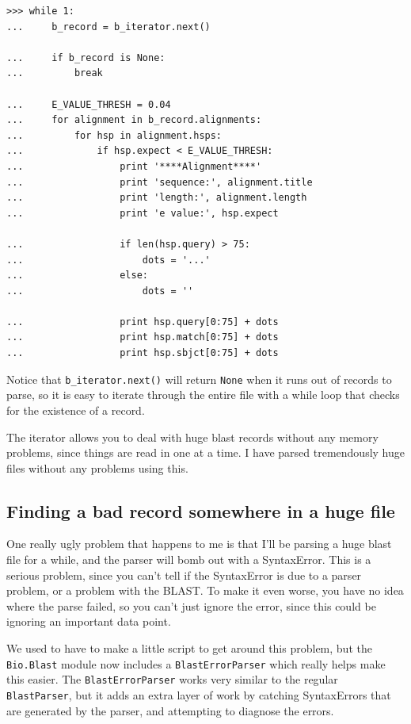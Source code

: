\documentclass{report}
\begin{document}
\begin{verbatim}
>>> while 1:
...     b_record = b_iterator.next()

...     if b_record is None:
...         break

...     E_VALUE_THRESH = 0.04
...     for alignment in b_record.alignments:
...         for hsp in alignment.hsps:
...             if hsp.expect < E_VALUE_THRESH:
...                 print '****Alignment****'
...                 print 'sequence:', alignment.title
...                 print 'length:', alignment.length
...                 print 'e value:', hsp.expect

...                 if len(hsp.query) > 75:
...                     dots = '...'
...                 else:
...                     dots = ''
                
...                 print hsp.query[0:75] + dots
...                 print hsp.match[0:75] + dots
...                 print hsp.sbjct[0:75] + dots
\end{verbatim}

Notice that \verb|b_iterator.next()| will return \verb|None| when it runs out of records to parse, so it is easy to iterate through the entire file with a while loop that checks for the existence of a record.


The iterator allows you to deal with huge blast records without any memory problems, since things are read in one at a time. I have parsed tremendously huge files without any problems using this.

\subsection{Finding a bad record somewhere in a huge file}

One really ugly problem that happens to me is that I'll be parsing a huge blast file for a while, and the parser will bomb out with a SyntaxError. This is a serious problem, since you can't tell if the SyntaxError is due to a parser problem, or a problem with the BLAST. To make it even worse, you have no idea where the parse failed, so you can't just ignore the error, since this could be ignoring an important data point.


We used to have to make a little script to get around this problem, but the \verb|Bio.Blast| module now includes a \verb|BlastErrorParser| which really helps make this easier. The \verb|BlastErrorParser| works very similar to the regular \verb|BlastParser|, but it adds an extra layer of work by catching SyntaxErrors that are generated by the parser, and attempting to diagnose the errors.
\end{document}
